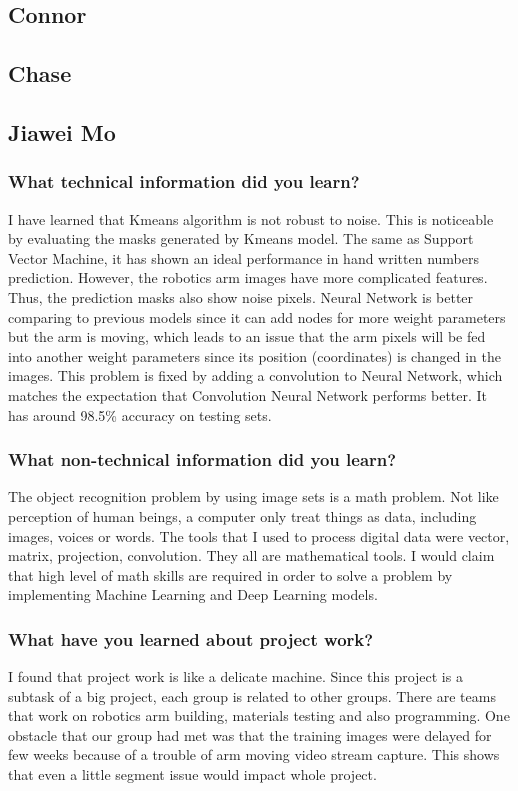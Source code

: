 \documentclass[10pt,journal,compsoc, draftclsnofoot,onecolumn]{IEEEtran}
\begin{document}
\subsection{Connor}
\subsection{Chase}

\subsection{Jiawei Mo}
\subsubsection{What technical information did you learn?}
I have learned that Kmeans algorithm is not robust to noise. This is noticeable by evaluating the masks generated by Kmeans model. The same as Support Vector Machine, it has shown an ideal performance in hand written numbers prediction. However, the robotics arm images have more complicated features. Thus, the prediction masks also show noise pixels. Neural Network is better comparing to previous models since it can add nodes for more weight parameters but the arm is moving, which leads to an issue that the arm pixels will be fed into another weight parameters since its position (coordinates) is changed in the images. This problem is fixed by adding a convolution to Neural Network, which matches the expectation that Convolution Neural Network performs better. It has around 98.5\% accuracy on testing sets.

\subsubsection{What non-technical information did you learn?}
The object recognition problem by using image sets is a math problem. Not like perception of human beings, a computer only treat things as data, including images, voices or words. The tools that I used to process digital data were vector, matrix, projection, convolution. They all are mathematical tools. I would claim that high level of math skills are required in order to solve a problem by implementing Machine Learning and Deep Learning models.

\subsubsection{What have you learned about project work?}
I found that project work is like a delicate machine. Since this project is a subtask of a big project, each group is related to other groups. There are teams that work on robotics arm building, materials testing and also programming. One obstacle that our group had met was that the training images were delayed for few weeks because of a trouble of arm moving video stream capture. This shows that even a little segment issue would impact whole project. 
\end{document}
